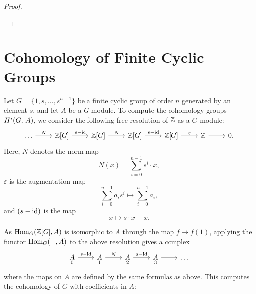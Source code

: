 \documentclass[a4paper, oneside]{memoir}
\begin{document}
\begin{proof}
\begin{center}
\label{fig:SpSeq}
	\end{center}
\end{proof}

\section{Cohomology of Finite Cyclic Groups}
Let $G=\{1,s,\ldots,s^{n-1}\}$ be a finite cyclic group of order $n$ generated by an element $s$, and let $A$ be a $G$-module. To compute the cohomology groups $H^{i}( G, \, A )$, we consider the following free resolution of $\mathbb{Z}$ as a $G$-module:
\begin{equation}\label{eq:CycRes}
	\begin{tikzcd}
		\dots \arrow[r, "N"] & \ZG{G} \arrow[r, "s-\id"] & \ZG{G} \arrow[r, "N"] & \ZG{G} \arrow[r, "s-\id"] & \ZG{G} \arrow[r, "\varepsilon"] & \Z \arrow[r] & 0.
	\end{tikzcd}
\end{equation}
Here, $N$ denotes the norm map
\[
	N(x)=\sum_{i=0}^{n-1} s^i\cdot x,
\]
$\varepsilon$ is the augmentation map
\[
	\sum_{i=0}^{n-1} a_i s^i \mapsto \sum_{i=0}^{n-1} a_i,
\]
and $(s-\operatorname{id})$ is the map \[x\mapsto s\cdot x-x.\]

As $\operatorname{Hom}_G(\mathbb{Z}[G],A)$ is isomorphic to $A$ through the map $f\mapsto f(1)$, applying the functor $\operatorname{Hom}_G(-,A)$ to the above resolution gives a complex
\[
	\begin{tikzcd}
		\underset{0}{A} \arrow[r, "s-\id"] & \underset{1}{A} \arrow[r, "N"] & \underset{2}{A} \arrow[r, "s-\id"] & \underset{3}{A} \arrow[r] & \dots
	\end{tikzcd}
\]
where the maps on $A$ are defined by the same formulas as above. This computes the cohomology of $G$ with coefficients in $A$:
\end{document}
